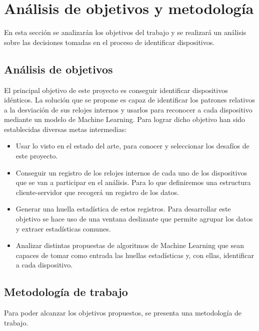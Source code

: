 
\lstset{frame=single,basicstyle=\ttfamily\small}

\chapter{Análisis de objetivos y metodología} \label{chap:meto}

En esta sección se analizarán los objetivos del trabajo y se realizará un análisis sobre las decisiones tomadas en el proceso de identificar dispositivos.

\section{Análisis de objetivos}

El principal objetivo de este proyecto es conseguir identificar dispositivos idénticos. La solución que se propone es capaz de identificar los patrones relativos a la desviación de sus relojes internos y usarlos para reconocer a cada dispositivo mediante un modelo de Machine Learning. Para lograr dicho objetivo han sido establecidas diversas metas intermedias:

\begin{itemize}
    \item Usar lo visto en el estado del arte, para conocer y seleccionar los desafíos de este proyecto.
    \item Conseguir un registro de los relojes internos de cada uno de los dispositivos que se van a participar en el análisis. Para lo que definiremos una estructura cliente-servidor que recogerá un registro de los datos.
    \item Generar una huella estadística de estos registros. Para desarrollar este objetivo se hace uso de una ventana deslizante que permite agrupar los datos y extraer estadísticas comunes.
    \item Analizar distintas propuestas de algoritmos de Machine Learning que sean capaces de tomar como entrada las huellas estadísticas y, con ellas, identificar a cada dispositivo.
\end{itemize}

\section{Metodología de trabajo}

Para poder alcanzar los objetivos propuestos, se presenta una metodología de trabajo.

